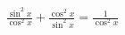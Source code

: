 \documentclass[preview]{standalone}
\begin{document}
\begin{align*}
\frac{\sin^2x}{\cos^2x}+\frac{\cos^2x}{\sin^2x}=\frac{1}{\cos^2x}
\end{align*}
\end{document}
